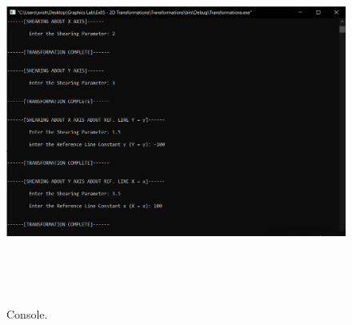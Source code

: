 \documentclass[12pt, a4]{article}
\begin{document}
\subsection*{}
\begin{figure}[h]
\centering
\caption{Console.}
\includegraphics[height=12cm, width=17cm]{Outputs/Console-15.png}
\end{figure}

\newpage
\end{document}
